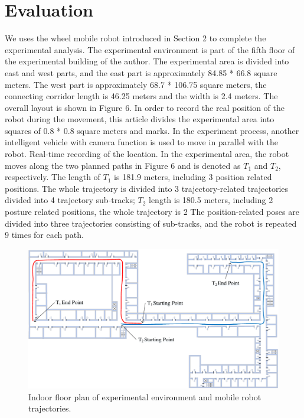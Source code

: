 \documentclass{llncs}
\begin{document}
\section{Evaluation}

We uses the wheel mobile robot introduced in Section 2 to complete the experimental analysis. The experimental environment is part of the fifth floor of the experimental building of the author. The experimental area is divided into east and west parts, and the east part is approximately 84.85 * 66.8 square meters. The west part is approximately 68.7 * 106.75 square meters, the connecting corridor length is 46.25 meters and the width is 2.4 meters. The overall layout is shown in Figure 6. In order to record the real position of the robot during the movement, this article divides the experimental area into squares of 0.8 * 0.8 square meters and marks. In the experiment process, another intelligent vehicle with camera function is used to move in parallel with the robot. Real-time recording of the location. In the experimental area, the robot moves along the two planned paths in Figure 6 and is denoted as $T_1$ and $T_2$, respectively. The length of $T_1$ is 181.9 meters, including 3 position related positions. The whole trajectory is divided into 3 trajectory-related trajectories divided into 4 trajectory sub-tracks; $T_2$ length is 180.5 meters, including 2 posture related positions, the whole trajectory is 2 The position-related poses are divided into three trajectories consisting of sub-tracks, and the robot is repeated $9$ times for each path.

\begin{figure}[!htbp]
	\centering
	\includegraphics[width=4.976in]{RobotMatch-Environment}
	\caption{Indoor floor plan of experimental environment and mobile robot trajectories.}
	\label{fig-environment}
\end{figure}
\end{document}
